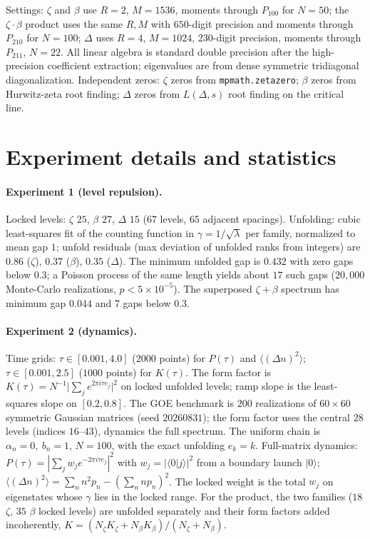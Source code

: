 \documentclass[aps,prx,reprint,floatfix]{revtex4-2}
\begin{document}
\noindent Settings: $\zeta$ and $\beta$ use $R=2$, $M=1536$, moments through
$P_{100}$ for $N=50$; the $\zeta\cdot\beta$ product uses the same $R,M$ with
$650$-digit precision and moments through $P_{210}$ for $N=100$; $\Delta$ uses
$R=4$, $M=1024$, $230$-digit precision, moments through $P_{211}$, $N=22$.
All linear algebra is standard double precision after the high-precision
coefficient extraction; eigenvalues are from dense symmetric tridiagonal
diagonalization. Independent zeros: $\zeta$ zeros from
\texttt{mpmath.zetazero}; $\beta$ zeros from Hurwitz-zeta root finding;
$\Delta$ zeros from $L(\Delta,s)$ root finding on the critical line.

\section{Experiment details and statistics}
\label{app:exp}

\paragraph{Experiment 1 (level repulsion).}
Locked levels: $\zeta$ $25$, $\beta$ $27$, $\Delta$ $15$ ($67$ levels,
$65$ adjacent spacings). Unfolding: cubic least-squares fit of the counting
function in $\gamma=1/\sqrt{\lambda}$ per family, normalized to mean gap
$1$; unfold residuals (max deviation of unfolded ranks from integers) are
$0.86$ ($\zeta$), $0.37$ ($\beta$), $0.35$ ($\Delta$). The minimum unfolded
gap is $0.432$ with zero gaps below $0.3$; a Poisson process of the same
length yields about $17$ such gaps ($20{,}000$ Monte-Carlo realizations,
$p<5\times10^{-5}$). The superposed $\zeta+\beta$ spectrum has minimum gap
$0.044$ and $7$ gaps below $0.3$.

\paragraph{Experiment 2 (dynamics).}
Time grids: $\tau\in[0.001,4.0]$ ($2000$ points) for $P(\tau)$ and
$\langle(\Delta n)^2\rangle$; $\tau\in[0.001,2.5]$ ($1000$ points) for
$K(\tau)$. The form factor is
$K(\tau)=N^{-1}\big|\sum_j e^{2\pi i\tau e_j}\big|^2$ on locked unfolded
levels; ramp slope is the least-squares slope on $[0.2,0.8]$. The GOE
benchmark is $200$ realizations of $60\times60$ symmetric Gaussian matrices
(seed $20260831$); the form factor uses the central $28$ levels (indices
$16$--$43$), dynamics the full spectrum. The uniform chain is
$\alpha_n=0,\ b_n=1$, $N=100$, with the exact unfolding $e_k=k$. Full-matrix
dynamics: $P(\tau)=|\sum_j w_j e^{-2\pi i\tau e_j}|^2$ with
$w_j=|\langle 0|j\rangle|^2$ from a boundary launch $|0\rangle$;
$\langle(\Delta n)^2\rangle=\sum_n n^2 p_n-(\sum_n n p_n)^2$. The locked
weight is the total $w_j$ on eigenstates whose $\gamma$ lies in the locked
range. For the product, the two families ($18$ $\zeta$, $35$ $\beta$ locked
levels) are unfolded separately and their form factors added incoherently,
$K=(N_\zeta K_\zeta+N_\beta K_\beta)/(N_\zeta+N_\beta)$.
\end{document}

